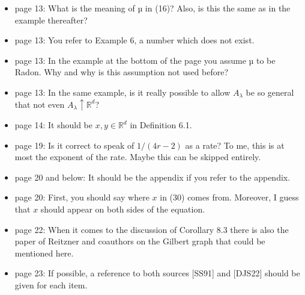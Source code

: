 \documentclass[11pt]{article}
\def\real{{\mathord{{\rm I\kern-2.8pt R}}}}        %
\def\real{{\mathord{\mathbb R}}}
\begin{document}
\begin{itemize}
  \item  page 13: What is the meaning of µ in (16)? Also, is this the same as in the example thereafter?
  \item  page 13: You refer to Example 6, a number which does not exist.
  \item  page 13: In the example at the bottom of the page you assume µ to be Radon. Why and why is this assumption not used before?
  \item  page 13: In the same example, is it really possible to allow
    $A_\lambda$ be so general that not even $A_\lambda \uparrow \real^d$?
  \item  page 14: It should be $x, y \in \real^d$ in Definition 6.1.
  \item  page 19: Is it correct to speak of $1/(4r - 2)$ as a rate? To me, this is at most the exponent of the rate. Maybe this can be skipped entirely.
  \item  page 20 and below: It should be the appendix if you refer to the appendix.
  \item  page 20: First, you should say where $x$ in (30) comes from. Moreover, I guess that $x$ should appear on both sides of the equation.
  \item  page 22: When it comes to the discussion of Corollary 8.3 there is also the paper of Reitzner and coauthors on the Gilbert graph that could be mentioned here.
  \item  page 23: If possible, a reference to both sources [SS91] and [DJS22] should be given for each item.
\end{itemize}
\end{document}
